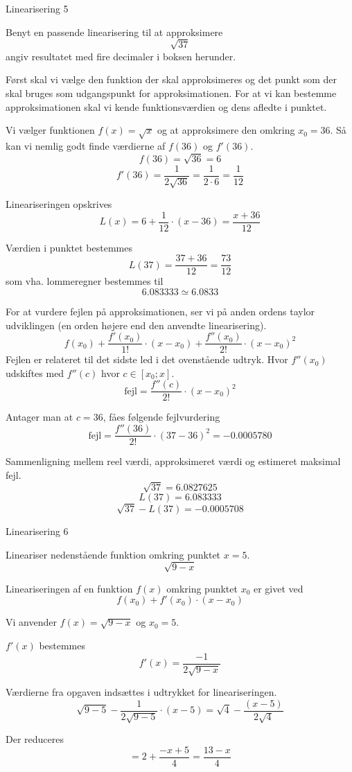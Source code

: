 \documentclass{article}
\begin{document}
\begin{exercise}{Linearisering 5}
	
	Benyt en passende linearisering til at approksimere
	\[
	\sqrt{37}
	\]
	angiv resultatet med fire decimaler i boksen herunder.
	
	\hint
	Først skal vi vælge den funktion der skal approksimeres
	og det punkt som der skal bruges som udgangspunkt for 
	approksimationen.
	For at vi kan bestemme approksimationen skal vi 
	kende funktionsværdien og dens afledte i punktet.
	
	\hint
	Vi vælger funktionen $f(x) = \sqrt{x}$ og at approksimere den 
	omkring $x_0 = 36$.
	Så kan vi nemlig godt finde værdierne af $f(36)$ og $f'(36)$.
	\[
	f(36) = \sqrt{36} = 6
	\]
	\[
	f'(36) = \frac{1}{2 \sqrt{36}} = \frac{1}{2 \cdot 6 } = \frac{1}{12}
	\]
	
	\hint
	Lineariseringen opskrives
	\[
	L(x) = 6 + \frac{1}{12} \cdot (x - 36) = \frac{x + 36}{12}
	\]
	
	\hint
	Værdien i punktet bestemmes
	\[
	L(37) = \frac{37 + 36}{12} = \frac{73}{12}
	\]
	som vha. lommeregner bestemmes til 
	\[
	6.083333 \simeq 6.0833
	\]
	
	\hint

	For at vurdere fejlen på approksimationen, ser vi på anden 
	ordens taylor udviklingen (en orden højere end den 
	anvendte linearisering).
	\[
	f(x_0) 
	+ \frac{f'(x_0)}{1!} \cdot (x - x_0) 
	+ \frac{f''(x_0)}{2!} \cdot (x - x_0)^2
	\]
	Fejlen er relateret til det sidste led i det ovenstående udtryk.
	Hvor $f''(x_0)$ udskiftes med $f''(c)$ hvor $c \in [x_0; x]$.
	\[
	\textrm{fejl} = \frac{f''(c)}{2!} \cdot (x - x_0)^2
	\]
	
	\hint 
	Antager man at $c = 36$, fåes følgende fejlvurdering
	\[
	\textrm{fejl} = \frac{f''(36)}{2!} \cdot (37 - 36)^2 = 
	-0.0005780
	\]
	
	\hint
	Sammenligning mellem reel værdi, approksimeret værdi og estimeret maksimal fejl.
	\[
	\sqrt{37}= 6.0827625
	\]
	\[
	L(37) = 6.083333
	\]
	\[
	\sqrt{37} - L(37)  = -0.0005708
	\]
	
\end{exercise}

\begin{exercise}{Linearisering 6}

	Lineariser nedenstående funktion omkring punktet $x = 5$.
	\[
	\sqrt{9-x}
	\]
	
	
	\hint
	Lineariseringen af en funktion $f(x)$
	omkring punktet $x_0$ er givet ved
	\[
	f(x_0) + f'(x_0) \cdot (x - x_0)
	\]
	
	\hint
	Vi anvender $f(x) = \sqrt{9-x}$ og $x_0 = 5$.
	
	\hint
	$f'(x)$ bestemmes
	\[
	f'(x) = \frac{-1}{2 \sqrt{9 - x}}
	\]
	
	\hint
	Værdierne fra opgaven indsættes i udtrykket for lineariseringen.
	\[
	\sqrt{9 - 5} - \frac{1}{2 \sqrt{9 - 5}} \cdot (x - 5) = \sqrt{4} - \frac{(x-5)}{2 \sqrt{4}} 
	\]
	
	\hint
	Der reduceres
	\[
	= 2 + \frac{-x + 5}{4} = \frac{13 - x}{4}
	\]
	
\end{exercise}
\end{document}
